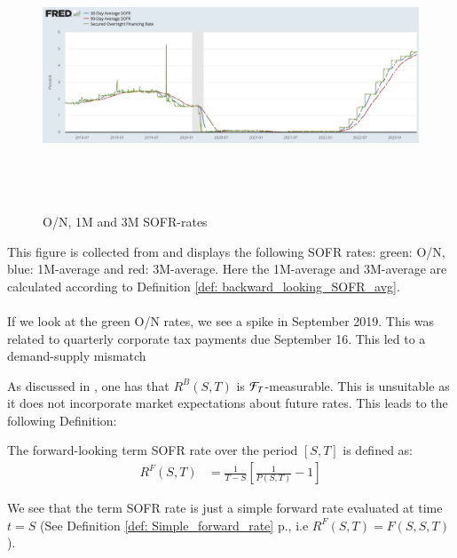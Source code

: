 \begin{figure}[htp]
    \centering
    \includegraphics[height = 8cm, width=16cm]{figures/SOFR/ON_1M_3M_SOFR.PNG}
    \caption{O/N, 1M and 3M SOFR-rates}
    \label{fig: ON_1M_3M_SOFR}
\end{figure}

This figure is collected from \cite{FredSOFR} 
and displays the following SOFR rates:
green: O/N, blue: 1M-average and red: 3M-average. Here the 1M-average and 3M-average are calculated according to Definition \ref{def: backward_looking_SOFR_avg}. 
\\~\\
If we look at the green O/N rates, we see a spike in September 2019.  This was related to quarterly corporate tax payments due September 16. This led to a demand-supply mismatch  \cite{FederalReserve2019}

\newpage 
As discussed in \cite{Skov_2020}, one has that $R^{B}(S,T)$ is $\mathcal{F}_{T}$-measurable. This is unsuitable as it does not incorporate market expectations about future rates. This leads to the following Definition: 

\begin{definition}
The forward-looking term SOFR rate over the period $[S,T]$ is defined as: 
\begin{align*}
R^{F}(S,T) &= \frac{1}{T-S}\left[
\frac{1}{P(S,T)} -1
\right]    
\end{align*}
\end{definition}

We see that the term SOFR rate is just a simple forward rate evaluated at time $t=S$ (See Definition \ref{def: Simple_forward_rate} p.\pageref{def: Simple_forward_rate}, i.e $R^{F}(S,T) = F(S,S,T)$). 

